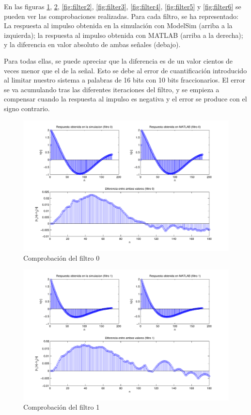 \documentclass[a4paper,12pt]{article}
\begin{document}
En las figuras \ref{fig:filter0}, \ref{fig:filter1}, \ref{fig:filter2}, \ref{fig:filter3}, \ref{fig:filter4}, \ref{fig:filter5} y \ref{fig:filter6} se pueden ver las comprobaciones realizadas. Para cada filtro, se ha representado: La respuesta al impulso obtenida en la simulación con ModelSim (arriba a la izquierda); la respuesta al impulso obtenida con MATLAB (arriba a la derecha); y la diferencia en valor absoluto de ambas señales (debajo).

Para todas ellas, se puede apreciar que la diferencia es de un valor cientos de veces menor que el de la señal. Esto se debe al error de cuantificación introducido al limitar nuestro sistema a palabras de 16 bits con 10 bits fraccionarios. El error se va acumulando tras las diferentes iteraciones del filtro, y se empieza a compensar cuando la respuesta al impulso es negativa y el error se produce con el signo contrario. 

\begin{figure}[hbt]
\includegraphics[width=\textwidth]{img/respfiltro0.pdf} 
\caption{Comprobación del filtro 0} \label{fig:filter0}
\end{figure}

\begin{figure}[hbt]
\includegraphics[width=\textwidth]{img/respfiltro1.pdf} 
\caption{Comprobación del filtro 1} \label{fig:filter1}
\end{figure}
\end{document}
